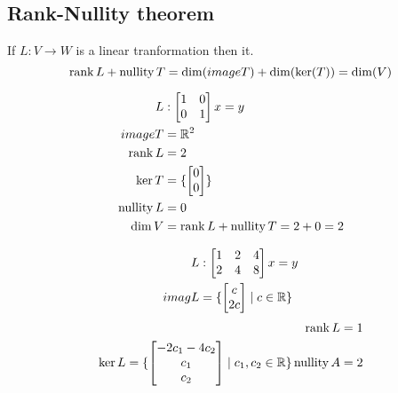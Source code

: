 \begin{example}
    \section{Rank-Nullity theorem}
    If \(L : V \rightarrow W\) is a linear tranformation then it.
    \begin{equation}
        \operatorname{rank} L + \operatorname{nullity} T = \dim (image T) + \dim(\ker(T)) = \dim(V)
    \end{equation}
    \begin{example}
        \begin{align*}
            L          & : \begin{bmatrix}
                1 & 0 \\ 0 & 1
            \end{bmatrix} x = y \\
            image T    & = \mathbb{R}^2                     \\
            \operatorname{rank} L    & = 2                                \\
            \ker T     & = \{ \begin{bmatrix}
                0 \\ 0
            \end{bmatrix} \} \\
            \operatorname{nullity} L & = 0                                \\
            \dim V     & = \operatorname{rank} L + \operatorname{nullity} T = 2 +0 = 2
        \end{align*}
    \end{example}
    \begin{example}
        \begin{align*}
            L      & : \begin{bmatrix}
                1 & 2 & 4 \\ 2 & 4 & 8
            \end{bmatrix} x = y \\
            imag L & = \{
                \begin{bmatrix}
                    c \\ 2 c
                \end{bmatrix}
             \mid c \in \mathbb{R} \}
        \end{align*}
        \begin{align*}
            \operatorname{rank} L = 1 \\
            \ker L = \{
                \begin{bmatrix}
                    -2 c_1 - 4 c_2 \\ c_1 \\  c_2
                \end{bmatrix}
             \mid  c_1, c_2 \in \mathbb{R} \}
            \operatorname{nullity} A = 2
        \end{align*}
    \end{example}
\end{example}